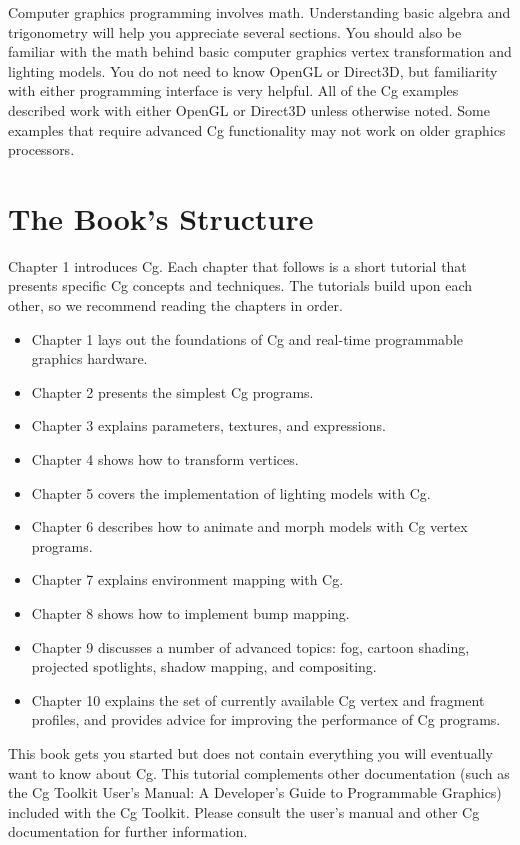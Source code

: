 \documentclass[../main.tex]{subfiles}
\begin{document}
Computer graphics programming involves math. Understanding basic algebra and trigonometry will help you appreciate several sections. You should also be familiar with the math behind basic computer graphics vertex transformation and lighting models. You do not need to know OpenGL or Direct3D, but familiarity with either programming interface is very helpful. All of the Cg examples described work with either OpenGL or Direct3D unless otherwise noted. Some examples that require advanced Cg functionality may not work on older graphics processors.

\section*{The Book's Structure}

Chapter 1 introduces Cg. Each chapter that follows is a short tutorial that presents specific Cg concepts and techniques. The tutorials build upon each other, so we recommend reading the chapters in order.

\FloatBarrier
\begin{itemize}
\item Chapter 1 lays out the foundations of Cg and real-time programmable graphics hardware.
\item Chapter 2 presents the simplest Cg programs.
\item Chapter 3 explains parameters, textures, and expressions.
\item Chapter 4 shows how to transform vertices.
\item Chapter 5 covers the implementation of lighting models with Cg.
\item Chapter 6 describes how to animate and morph models with Cg vertex programs.
\item Chapter 7 explains environment mapping with Cg.
\item Chapter 8 shows how to implement bump mapping.
\item Chapter 9 discusses a number of advanced topics: fog, cartoon shading, projected spotlights, shadow mapping, and compositing.
\item Chapter 10 explains the set of currently available Cg vertex and fragment profiles, and provides advice for improving the performance of Cg programs.
\end{itemize}
\FloatBarrier

This book gets you started but does not contain everything you will eventually want to know about Cg. This tutorial complements other documentation (such as the Cg Toolkit User's Manual: A Developer's Guide to Programmable Graphics) included with the Cg Toolkit. Please consult the user's manual and other Cg documentation for further information.
\end{document}
